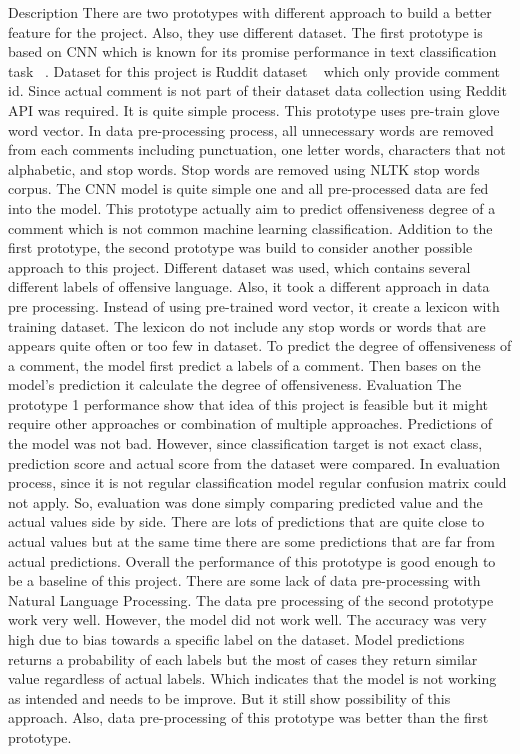 \documentclass[12pt, natbib=false]{article}
\begin{document}
Description
There are two prototypes with different approach to build a better feature for the project. Also, they use different dataset. The first prototype is based on CNN which is known for its promise performance in text classification task ~\cite{wang2021short}. Dataset for this project is Ruddit dataset ~\cite{hada2021ruddit} which only provide comment id. Since actual comment is not part of their dataset data collection using Reddit API was required. It is quite simple process. This prototype uses pre-train glove word vector. In data pre-processing process, all unnecessary words are removed from each comments including punctuation, one letter words, characters that not alphabetic, and stop words. Stop words are removed using NLTK stop words corpus. The CNN model is quite simple one and all pre-processed data are fed into the model. This prototype actually aim to predict offensiveness degree of a comment which is not common machine learning classification. Addition to the first prototype, the second prototype was build to consider another possible approach to this project. Different dataset was used, which contains several different labels of offensive language.  Also, it took a different approach in data pre processing. Instead of using pre-trained word vector, it create a lexicon with training dataset. The lexicon do not include any stop words or words that are appears quite often or too few in dataset. To predict the degree of offensiveness of a comment, the model first predict a labels of a comment. Then bases on the model’s prediction it calculate the degree of offensiveness.
Evaluation
The prototype 1 performance show that idea of this project is feasible but it might require other approaches or combination of multiple approaches. Predictions of the model was not bad. However, since classification target is not exact class, prediction score and actual score from the dataset were compared. In evaluation process, since it is not regular classification model regular confusion matrix could not apply. So, evaluation was done simply comparing predicted value and the actual values side by side. There are lots of predictions that are quite close to actual values but at the same time there are some predictions that are far from actual predictions. Overall the performance of this prototype is good enough to be a baseline of this project. There are some lack of data pre-processing with Natural Language Processing. The data pre processing of the second prototype work very well.  However, the model did not work well. The accuracy was very high due to bias towards a specific label on the dataset. Model predictions returns a probability of each labels but the most of cases they return similar value regardless of actual labels. Which indicates that the model is not working as intended and needs to be improve. But it still show possibility of this approach. Also, data pre-processing of this prototype was better than the first prototype.
\end{document}
